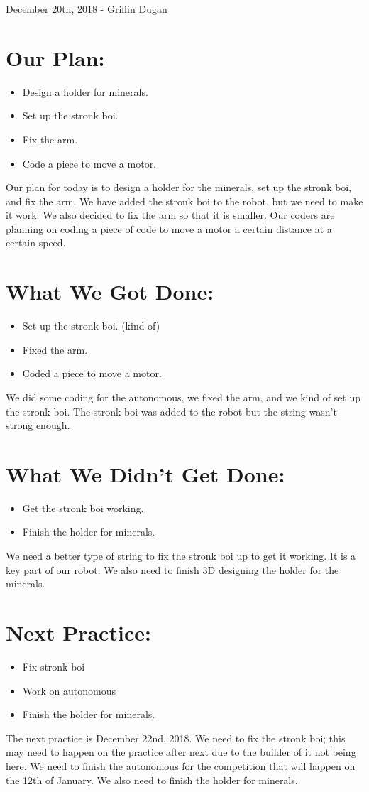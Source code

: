 \documentclass[12pt]{article}
\begin{document}
December 20th, 2018 - Griffin Dugan

\section{Our Plan:}
\begin{itemize}
	\item Design a holder for minerals.
	\item Set up the stronk boi.
	\item Fix the arm.
	\item Code a piece to move a motor.
\end{itemize}

Our plan for today is to design a holder for the minerals, set up the stronk boi, and fix the arm. We have added the stronk boi to the robot, but we need to make it work. We also decided to fix the arm so that it is smaller.  Our coders are planning on coding a piece of code to move a motor a certain distance at a certain speed.

\section{What We Got Done:} 
\begin{itemize}
	\item Set up the stronk boi. (kind of)
	\item Fixed the arm.
	\item Coded a piece to move a motor.
\end{itemize}

We did some coding for the autonomous, we fixed the arm, and we kind of set up the stronk boi. The stronk boi was added to the robot but the string wasn't strong enough.

\section{What We Didn't Get Done:} 
\begin{itemize}
	\item Get the stronk boi working.
	\item Finish the holder for minerals.
\end{itemize}

We need a better type of string to fix the stronk boi up to get it working. It is a key part of our robot. We also need to finish 3D designing the holder for the minerals.

\section{Next Practice:}
\begin{itemize}
	\item Fix stronk boi
	\item Work on autonomous
	\item Finish the holder for minerals.
\end{itemize}

The next practice is December 22nd, 2018.
We need to fix the stronk boi; this may need to happen on the practice after next due to the builder of it not being here. We need to finish the autonomous for the competition that will happen on the 12th of January. We also need to finish the holder for minerals.
\end{document}
